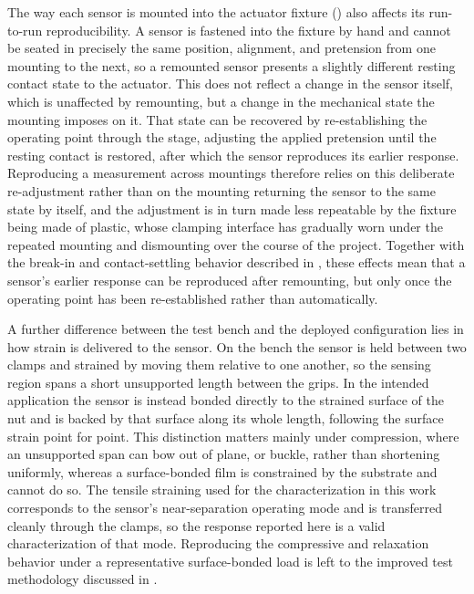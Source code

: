 The way each sensor is mounted into the actuator fixture () also affects its run-to-run reproducibility. 
A sensor is fastened into the fixture by hand and cannot be seated in precisely the same position, alignment, and pretension from one mounting to the next, so a remounted sensor presents a slightly different resting contact state to the actuator. 
This does not reflect a change in the sensor itself, which is unaffected by remounting, but a change in the mechanical state the mounting imposes on it. That state can be recovered by re-establishing the operating point through the stage, adjusting the applied pretension until the resting contact is restored, after which the sensor reproduces its earlier response. Reproducing a measurement across mountings therefore relies on this deliberate re-adjustment rather than on the mounting returning the sensor to the same state by itself, and the adjustment is in turn made less repeatable by the fixture being made of plastic, whose clamping interface has gradually worn under the repeated mounting and dismounting over the course of the project. 
Together with the break-in and contact-settling behavior described in , these effects mean that a sensor's earlier response can be reproduced after remounting, but only once the operating point has been re-established rather than automatically.

A further difference between the test bench and the deployed configuration lies in how strain is delivered to the sensor. On the bench the sensor is held between two clamps and strained by moving them relative to one another, so the sensing region spans a short unsupported length between the grips. In the intended application the sensor is instead bonded directly to the strained surface of the nut and is backed by that surface along its whole length, following the surface strain point for point. This distinction matters mainly under compression, where an unsupported span can bow out of plane, or buckle, rather than shortening uniformly, whereas a surface-bonded film is constrained by the substrate and cannot do so. The tensile straining used for the characterization in this work corresponds to the sensor's near-separation operating mode and is transferred cleanly through the clamps, so the response reported here is a valid characterization of that mode. Reproducing the compressive and relaxation behavior under a representative surface-bonded load is left to the improved test methodology discussed in .

